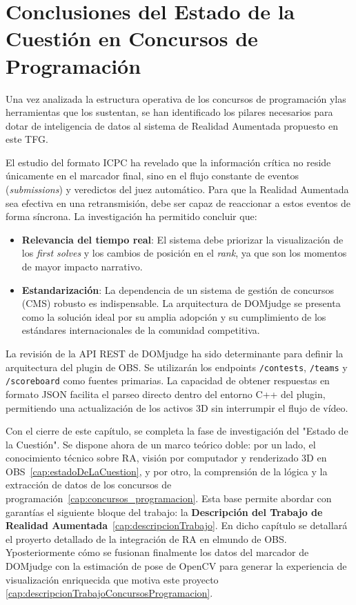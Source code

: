 \section{Conclusiones del Estado de la Cuestión en Concursos de
Programación}
\label{sec:conclusiones_concursos}
Una vez analizada la estructura operativa de los concursos de programación ylas herramientas que los sustentan, se han identificado los  pilares necesarios para dotar de inteligencia de datos al sistema de Realidad Aumentada propuesto en este TFG.

El estudio del formato ICPC ha revelado que la información crítica no reside
únicamente en el marcador final, sino en el flujo constante de eventos
(\textit{submissions}) y veredictos del juez automático. Para que la
Realidad Aumentada sea efectiva en una retransmisión, debe ser capaz de
reaccionar a estos eventos de forma síncrona. La investigación ha permitido
concluir que:
\begin{itemize}
\item \textbf{Relevancia del tiempo real}: El sistema debe priorizar la
visualización de los \textit{first solves} y los cambios de posición en el
\textit{rank}, ya que son los momentos de mayor impacto narrativo.
\item \textbf{Estandarización}: La dependencia de un sistema de gestión
de concursos (CMS) robusto es indispensable. La arquitectura de DOMjudge se
presenta como la solución ideal por su amplia adopción y su cumplimiento de
los estándares internacionales de la comunidad competitiva.
\end{itemize}

La revisión de la API REST de DOMjudge ha sido determinante para definir la
arquitectura del plugin de OBS. Se utilizarán los endpoints
\texttt{/contests}, \texttt{/teams} y \texttt{/scoreboard} como fuentes
primarias. La capacidad de obtener respuestas en formato JSON facilita el
parseo directo dentro del entorno C++ del plugin, permitiendo una
actualización de los activos 3D sin interrumpir el flujo de vídeo.

Con el cierre de este capítulo, se completa la fase de investigación del
"Estado de la Cuestión". Se dispone ahora de un marco teórico doble: por un
lado, el conocimiento técnico sobre RA, visión por computador y renderizado 3D
en OBS~\ref{cap:estadoDeLaCuestion}, y por otro, la comprensión de la lógica y la extracción
de datos de los concursos de programación~\ref{cap:concursos_programacion}.
Esta base permite abordar con garantías el siguiente bloque del trabajo: la
\textbf{Descripción del Trabajo de Realidad Aumentada}~\ref{cap:descripcionTrabajo}. En dicho capítulo se
detallará el proyerto detallado de la integración de RA en elmundo de OBS. Yposteriormente cómo se fusionan finalmente los datos del marcador de DOMjudge con la estimación de pose de OpenCV para generar la experiencia de visualización
enriquecida que motiva este proyecto \ref{cap:descripcionTrabajoConcursosProgramacion}.
